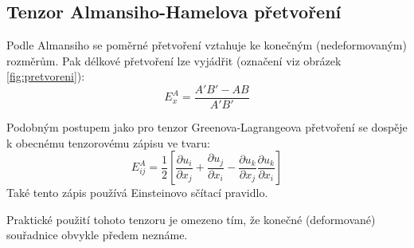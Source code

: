 
\subsection{Tenzor Almansiho-Hamelova přetvoření}
Podle Almansiho se poměrné přetvoření vztahuje ke konečným (nedeformovaným) rozměrům. Pak délkové přetvoření lze vyjádřit (označení viz obrázek \ref{fig:pretvoreni}):
\begin{equation}
	E^A_x = \frac{A'B' - AB}{A'B'}
\end{equation}

Podobným postupem jako pro tenzor Greenova-Lagrangeova přetvoření se dospěje k obecnému tenzorovému zápisu ve tvaru:
\begin{equation}
	E^A_{ij}
	= \frac{1}{2} \left[ \frac{\partial u_i}{\partial x_j} + \frac{\partial u_j}{\partial x_i} - \frac{\partial u_k}{\partial x_j} \frac{\partial u_k}{\partial x_i} \right]
\end{equation}
Také tento zápis používá Einsteinovo sčítací pravidlo.

Praktické použití tohoto tenzoru je omezeno tím, že konečné (deformované) souřadnice obvykle předem neznáme.
